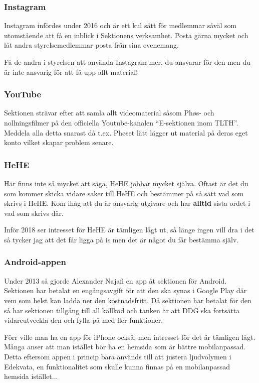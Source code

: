 \documentclass[10pt]{article}
\begin{document}
\subsubsection{Instagram}
Instagram infördes under 2016 och är ett kul sätt för medlemmar såväl som utomstående att få en inblick i Sektionens verksamhet. Posta gärna mycket och låt andra styrelsemedlemmar posta från sina evenemang.

Få de andra i styrelsen att använda Instagram mer, du ansvarar för den men du är inte ansvarig för att få upp allt material!

\subsubsection{YouTube}
Sektionen strävar efter att samla allt videomaterial såsom Ph\o s- och nollningsfilmer på den officiella Youtube-kanalen ``E-sektionen inom TLTH''. Meddela alla detta snarast då t.ex. Ph\o set lätt lägger ut material på deras eget konto vilket skapar problem senare.

\subsubsection{HeHE}
Här finns inte så mycket att säga, HeHE jobbar mycket själva. Oftast är det du som kommer skicka vidare saker till HeHE och bestämmer på så sätt vad som skrivs i HeHE. Kom ihåg att du är ansvarig utgivare och har \textbf{alltid} sista ordet i vad som skrivs där.

Inför 2018 ser intresset för HeHE är tämligen lågt ut, så länge ingen vill dra i det så tycker jag att det får ligga på is men det är något du får bestämma själv.

\subsubsection{Android-appen}
Under 2013 så gjorde Alexander Najafi en app åt sektionen för Android. Sektionen har betalat en engångsavgift för att den ska synas i Google Play där vem som helst kan ladda ner den kostnadsfritt. Då sektionen har betalat för den så har sektionen tillgång till all källkod och tanken är att DDG ska fortsätta vidareutveckla den och fylla på med fler funktioner.

Förr ville man ha en app för iPhone också, men intresset för det är tämligen lågt. Många anser att man istället bör ha en hemsida som är bättre mobilanpassad. Detta eftersom appen i princip bara används till att justera ljudvolymen i Edekvata, en funktionalitet som skulle kunna finnas på en mobilanpassad hemsida istället...
\end{document}
